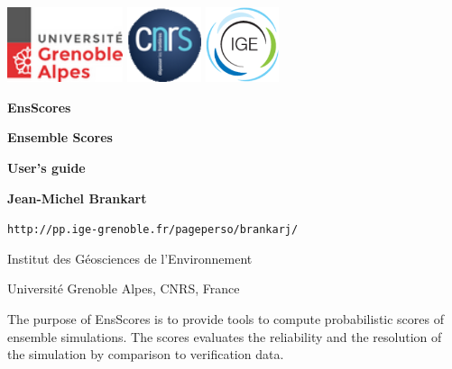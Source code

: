 \documentclass[11pt]{article}
\begin{document}
\pagestyle{empty}

\centerline{
\includegraphics[height=22mm]{Logos/logo_uga.png}
\hspace{5mm}
\includegraphics[height=22mm]{Logos/logo_cnrs.png}
\hfill
\includegraphics[height=22mm]{Logos/logo_ige.png}
}

\vspace{20mm}

\begin{center}

{\Huge\bf EnsScores}

\vspace{10mm}

{\Large\bf Ensemble Scores}

\vspace{10mm}

{\Large\bf User's guide}

\vspace{10mm}

{\large\bf Jean-Michel Brankart}

\vspace{5mm}
{\tt http://pp.ige-grenoble.fr/pageperso/brankarj/}

\vspace{5mm}
{\large Institut des G\'eosciences de l'Environnement}

\vspace{1mm}
{\large Universit\'e Grenoble Alpes, CNRS, France}

\end{center}

\vspace{20mm}
The purpose of EnsScores is to provide tools
to compute probabilistic scores of ensemble simulations.
The scores evaluates the reliability and the resolution of the simulation
by comparison to verification data.
\end{document}
